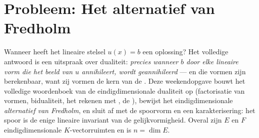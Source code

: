 \section{Probleem: Het alternatief van Fredholm}

Wanneer heeft het lineaire stelsel $u(x) = b$ een oplossing? Het
volledige antwoord is een uitspraak over dualiteit: \emph{precies
wanneer $b$ door elke lineaire vorm die het beeld van $u$
annihileert, wordt geannihileerd} --- en die vormen zijn
berekenbaar, want zij vormen de kern van de . Deze
weekendopgave bouwt het volledige woordenboek van de
eindigdimensionale dualiteit op (factorisatie van vormen,
bidualiteit, het rekenen met , de ),
bewijst het eindigdimensionale \emph{alternatief van Fredholm}, en
sluit af met de spoorvorm en een karakterisering: het spoor is de
enige lineaire invariant van de gelijkvormigheid. Overal zijn $E$
en $F$ eindigdimensionale $K$-vectorruimten en is $n = \dim E$.


